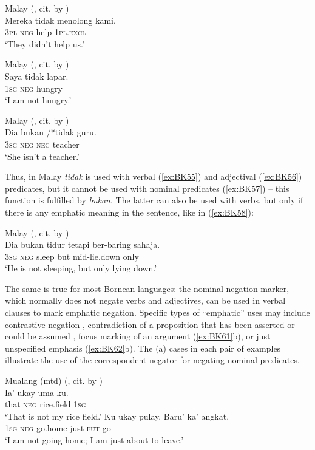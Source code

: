\documentclass[output=paper]{langsci/langscibook}
\begin{document}
\ea Malay (\citealp[195]{sneddon1996a}, cit. by \citealp[1]{kroeger2014a}) \label{ex:BK55}\\
	\gll Mereka	tidak	menolong	kami.\\
	\textsc{3pl}			\textsc{neg}	help			\textsc{1pl.excl}\\
	\glt `They didn’t help us.'
\z

\ea Malay (\citealp[88]{sudaryono1993a}, cit. by \citealp[1]{kroeger2014a}) \label{ex:BK56}\\
	\gll Saya	tidak	lapar.\\
	\textsc{1sg}	\textsc{neg}	hungry\\
	\glt `I am not hungry.'
\z

\ea Malay (\citealp[195]{sneddon1996a}, cit. by \citealp[1]{kroeger2014a}) \label{ex:BK57}\\
	\gll Dia	bukan	/*tidak	guru.\\
	\textsc{3sg}	\textsc{neg}		\textsc{neg}		teacher\\
	\glt `She isn’t a teacher.'
\z


Thus, in Malay \textit{tidak} is used with verbal (\ref{ex:BK55}) and adjectival (\ref{ex:BK56}) predicates, but it cannot be used with nominal predicates (\ref{ex:BK57}) – this function is fulfilled by \textit{bukan}. The latter can also be used with verbs, but only if there is any emphatic meaning in the sentence, like in (\ref{ex:BK58}):

\ea Malay (\citealp[145]{asmahhj1982a}, cit. by \citealp[1]{kroeger2014a}) \label{ex:BK58}\\
	\gll Dia	bukan	tidur	tetapi		ber-baring		sahaja.\\
	\textsc{3sg}	\textsc{neg}		sleep	but		mid-lie.down	only\\
	\glt `He is not sleeping, but only lying down.'
\z

The same is true for most Bornean languages: the nominal negation marker, which normally does not negate verbs and adjectives, can be used in verbal clauses to mark emphatic negation. Specific types of “emphatic” uses may include contrastive negation , contradiction of a proposition that has been asserted or could be assumed , focus marking of an argument (\ref{ex:BK61}b), or just unspecified emphasis (\ref{ex:BK62}b). The (a) cases in each pair of examples illustrate the use of the correspondent negator for negating nominal predicates.

\ea Mualang (mtd) (\citealp[examples 9–102, 110]{tjia2007a}, cit. by \citealt[5]{Kroeger2014}) \label{ex:BK59}\\
  \ea
	\gll Ia’		ukay	uma			ku.\\
	that	\textsc{neg}	rice.field	\textsc{1sg}\\
	\glt `That is not my rice field.'
  \ex
	\gll Ku		ukay	pulay.		Baru’		ka’	angkat.\\
	\textsc{1sg}	\textsc{neg}	go.home		just		\textsc{fut}	go\\
	\glt `I am not going home; I am just about to leave.'
\z \z
\end{document}
